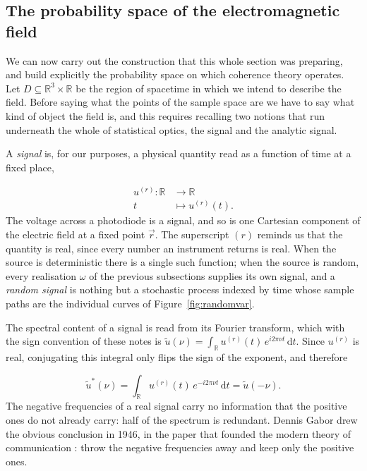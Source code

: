 	\subsection{The probability space of the electromagnetic field}

		We can now carry out the construction that this whole section was preparing, and build
		explicitly the probability space on which coherence theory operates. Let
		$D\subseteq\mathbb{R}^{3}\times\mathbb{R}$ be the region of spacetime in which we intend
		to describe the field. Before saying what the points of the sample space are we have to
		say what kind of object the field is, and this requires recalling two notions that run
		underneath the whole of statistical optics, the signal and the analytic signal.

		A \textit{signal} is, for our purposes, a physical quantity read as a function of time
		at a fixed place,

		\begin{equation}\label{eq:Signal}
			\begin{split}
				u^{(r)} : \mathbb{R} &\longrightarrow \mathbb{R}\\
				t &\longmapsto u^{(r)}(t).
			\end{split}
		\end{equation}
		The voltage across a photodiode is a signal, and so is one Cartesian component of the
		electric field at a fixed point $\vec{r}$. The superscript $(r)$ reminds us that the
		quantity is real, since every number an instrument returns is real. When the source is
		deterministic there is a single such function; when the source is random, every
		realisation $\omega$ of the previous subsections supplies its own signal, and a
		\textit{random signal} is nothing but a stochastic process indexed by time whose sample
		paths are the individual curves of Figure~\ref{fig:randomvar}.

		The spectral content of a signal is read from its Fourier transform, which with the
		sign convention of these notes is
		$\tilde{u}(\nu) = \int_{\mathbb{R}}u^{(r)}(t)\,e^{i2\pi\nu t}\,\mathrm{d}t$. Since
		$u^{(r)}$ is real, conjugating this integral only flips the sign of the exponent, and
		therefore

		\begin{equation}\label{eq:RealSymmetry}
			\tilde{u}^{*}(\nu) = \int_{\mathbb{R}}u^{(r)}(t)\,e^{-i2\pi\nu t}\,\mathrm{d}t = \tilde{u}(-\nu).
		\end{equation}
		The negative frequencies of a real signal carry no information that the positive ones
		do not already carry: half of the spectrum is redundant. Dennis Gabor drew the obvious
		conclusion in 1946, in the paper that founded the modern theory of communication
		\citep{gabor1946theory}: throw the negative frequencies away and keep only the
		positive ones.

